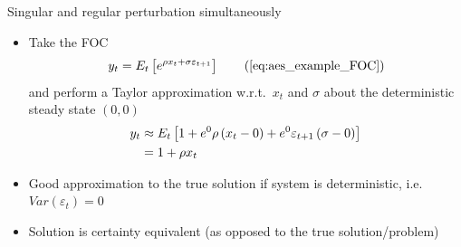 \begin{frame}{Singular and regular perturbation simultaneously}
  \begin{itemize}
    \item Take the FOC
          \begin{equation}
            y_t = {E_t}\left[ {{e^{\rho {x_t} + \sigma{\varepsilon _{t + 1}}}}} \right] \tag{\ref{eq:aes_example_FOC}}
          \end{equation}
          and perform a Taylor approximation w.r.t.\ $x_t$ and $\sigma$ about the deterministic steady state $(0,0)$
          \begin{align}
            {y_t} & \approx {E_t}\left[ {1 + {e^0}\rho \left( {{x_t} - 0} \right) + {e^0}{\varepsilon _{t + 1}}\left( {\sigma  - 0} \right)} \right] \notag \\
                  & = 1 + \rho {x_t}
          \end{align}
    \item Good approximation to the true solution if system is deterministic, i.e.\ $Var\left( {{\varepsilon _t}} \right)=0$
    \item Solution is certainty equivalent (as opposed to the true solution/problem)
  \end{itemize}
\end{frame}

